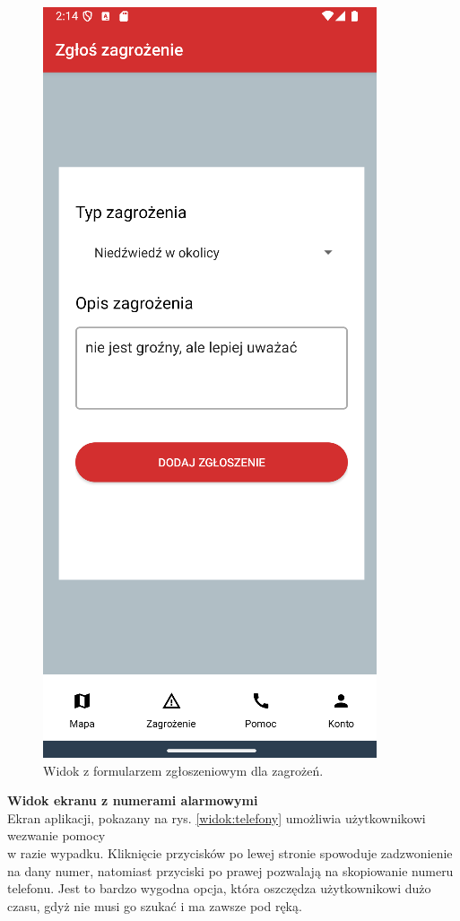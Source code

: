 \begin{figure}[H]
    \centering
    \includegraphics[scale=0.70]{img/imp/widok-danger.png}
    \caption{Widok z formularzem zgłoszeniowym dla zagrożeń.}
    \label{widok:zgłoszenie}
\end{figure}

\noindent
\textbf{Widok ekranu z numerami alarmowymi} \\
\indent Ekran aplikacji, pokazany na rys. \ref{widok:telefony} umożliwia użytkownikowi wezwanie pomocy \\w razie wypadku. Kliknięcie przycisków po lewej stronie spowoduje zadzwonienie na dany numer, natomiast przyciski po prawej pozwalają na skopiowanie numeru telefonu. Jest to bardzo wygodna opcja, która oszczędza użytkownikowi dużo czasu, gdyż nie musi go szukać i ma zawsze pod ręką.

